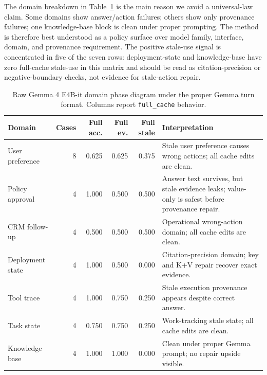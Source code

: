 \documentclass[11pt]{article}
\newcommand{\fullcache}{\texttt{full\_cache}}
\newcommand{\gemma}{Gemma 4 E4B-it}
\begin{document}
The domain breakdown in Table~\ref{tab:domain-phase} is the main reason we
avoid a universal-law claim. Some domains show answer/action failures; others
show only provenance failures; one knowledge-base block is clean under proper
prompting. The method is therefore best understood as a policy surface over
model family, interface, domain, and provenance requirement.
The positive stale-use signal is concentrated in five of the seven rows:
deployment-state and knowledge-base have zero full-cache stale-use in this
matrix and should be read as citation-precision or negative-boundary checks,
not evidence for stale-action repair.

\begin{table}[H]
\centering
\scriptsize
\begin{tabularx}{\linewidth}{lrrrrX}
\toprule
\textbf{Domain} & \textbf{Cases} & \textbf{Full acc.} & \textbf{Full ev.} & \textbf{Full stale} & \textbf{Interpretation} \\
\midrule
User preference & 8 & 0.625 & 0.625 & 0.375 & Stale user preference causes wrong actions; all cache edits are clean. \\
Policy approval & 4 & 1.000 & 0.500 & 0.500 & Answer text survives, but stale evidence leaks; value-only is safest before provenance repair. \\
CRM follow-up & 4 & 0.500 & 0.500 & 0.500 & Operational wrong-action domain; all cache edits are clean. \\
Deployment state & 4 & 1.000 & 0.500 & 0.000 & Citation-precision domain; key and K+V repair recover exact evidence. \\
Tool trace & 4 & 1.000 & 0.750 & 0.250 & Stale execution provenance appears despite correct answer. \\
Task state & 4 & 0.750 & 0.750 & 0.250 & Work-tracking stale state; all cache edits are clean. \\
Knowledge base & 4 & 1.000 & 1.000 & 0.000 & Clean under proper Gemma prompt; no repair upside visible. \\
\bottomrule
\end{tabularx}
\caption{Raw \gemma{} domain phase diagram under the proper Gemma turn format.
Columns report \fullcache{} behavior.}
\label{tab:domain-phase}
\end{table}
\end{document}
